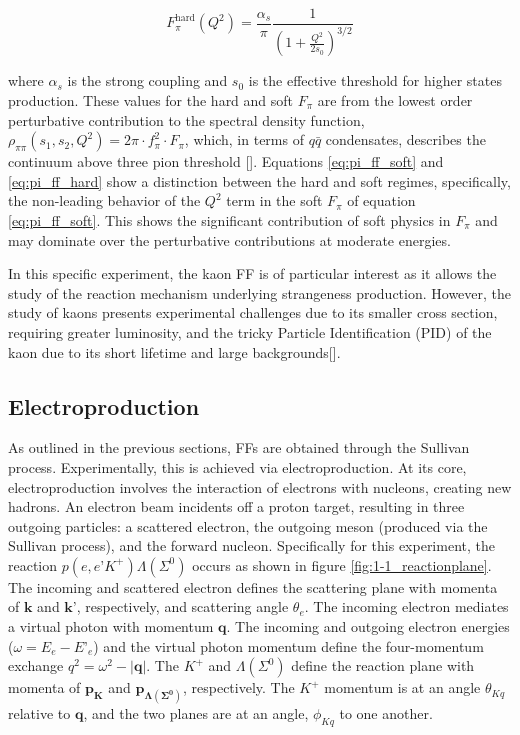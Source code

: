 \documentclass[
]{report}
\begin{document}
\begin{equation} 
    F_{\pi}^{\mathrm{hard}}(Q^2)=\frac{\alpha_s}{\pi}\frac{1}{(1+\frac{Q^2}{2s_0})^{3/2}}
  \label{eq:pi_ff_hard} 
\end{equation}

\noindent where \(\alpha_s\) is the strong coupling and \(s_0\) is the
effective threshold for higher states production. These values for the
hard and soft \(F_{\pi}\) are from the lowest order perturbative
contribution to the spectral density function,
\(\rho_{\pi\pi}(s_1,s_2,Q^2)=2\pi\cdot f_{\pi}^2\cdot F_{\pi}\), which,
in terms of \(q\bar{q}\) condensates, describes the continuum above
three pion threshold {[}\cite{horn_pion_2006}{]}. Equations
\ref{eq:pi_ff_soft} and \ref{eq:pi_ff_hard} show a distinction between
the hard and soft regimes, specifically, the non-leading behavior of the
\(Q^2\) term in the soft \(F_{\pi}\) of equation \ref{eq:pi_ff_soft}.
This shows the significant contribution of soft physics in \(F_{\pi}\)
and may dominate over the perturbative contributions at moderate
energies.

In this specific experiment, the kaon FF is of particular interest as it
allows the study of the reaction mechanism underlying strangeness
production. However, the study of kaons presents experimental challenges
due to its smaller cross section, requiring greater luminosity, and the
tricky Particle Identification (PID) of the kaon due to its short
lifetime and large backgrounds{[}\cite{bosted_studies_2008}{]}.

\hypertarget{electroproduction}{%
\subsection{Electroproduction}\label{electroproduction}}



As outlined in the previous sections, FFs are obtained through the
Sullivan process. Experimentally, this is achieved via
electroproduction. At its core, electroproduction involves the
interaction of electrons with nucleons, creating new hadrons. An
electron beam incidents off a proton target, resulting in three outgoing
particles: a scattered electron, the outgoing meson (produced via the
Sullivan process), and the forward nucleon. Specifically for this
experiment, the reaction \(p(e, e’K^+)\Lambda(\Sigma^0)\) occurs as
shown in figure \ref{fig:1-1_reactionplane}. The incoming and scattered
electron defines the scattering plane with momenta of \(\mathbf{k}\) and
\(\mathbf{k’}\), respectively, and scattering angle \(\theta_e\). The
incoming electron mediates a virtual photon with momentum
\(\mathbf{q}\). The incoming and outgoing electron energies
(\(\omega=E_e-E’_e\)) and the virtual photon momentum define the
four-momentum exchange \(q^2=\omega^2-|\mathbf{q}|\). The \(K^+\) and
\(\Lambda(\Sigma^0)\) define the reaction plane with momenta of
\(\mathbf{p_{K}}\) and
\(\mathbf{p}_{\boldsymbol{\Lambda(\Sigma^{0})}}\), respectively. The
\(K^+\) momentum is at an angle \(\theta_{Kq}\) relative to
\(\mathbf{q}\), and the two planes are at an angle, \(\phi_{Kq}\) to one
another.
\end{document}
